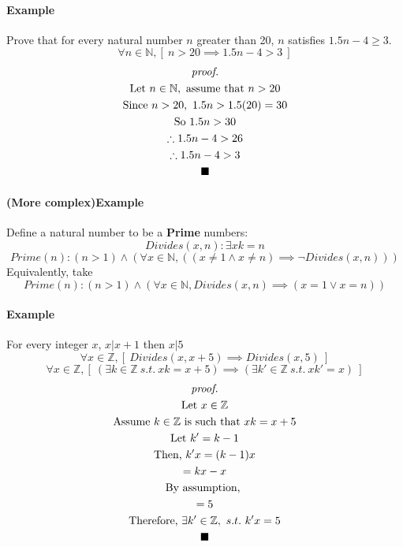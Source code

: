 \documentclass{article}
\begin{document}
	\paragraph{Example} Prove that for every natural number $n$ greater than 20, $n$ satisfies $1.5n-4\geq3$.
	\[
		\forall n \in \mathbb{N}, [\ n > 20 \implies 1.5n - 4 > 3\ ]
	\]
	\begin{multline*}
		\emph{proof.}\\
		\text{Let } n \in \mathbb{N}, \text{ assume that } n > 20 \\
		\text{Since } n > 20,\ 1.5n > 1.5(20) = 30 \\
		\text{So } 1.5 n > 30 \\
		\therefore 1.5n - 4 > 26 \\
		\therefore 1.5n - 4 > 3 \\
		\blacksquare
	\end{multline*}
	
	\paragraph{(More complex)Example} Define a natural number to be a \textbf{Prime} numbers:
	\[
		Divides(x,n): \exists x k = n
	\]
	\[
		Prime(n): (n > 1) \land (\forall x \in \mathbb{N}, ((x\neq1 \land x\neq n) \implies \neg Divides(x,n)))
	\]
	Equivalently, take 
	\[
		Prime(n): (n > 1) \land (\forall x \in \mathbb{N}, Divides(x,n) \implies (x = 1 \lor x = n))
	\]
	\paragraph{Example} For every integer $x$, $x \vert x + 1$ then $x \vert 5$
	\[
		\forall x \in \mathbb{Z}, [\ Divides(x, x+5) \implies Divides(x, 5)\ ]
	\]
	\[
		\forall x \in \mathbb{Z}, [\ (\exists k \in \mathbb{Z}\ s.t.\ xk = x + 5) \implies (\exists k' \in \mathbb{Z}\ s.t.\ xk' = x)\ ]
	\]
	\begin{multline*}
	\emph{proof.}\\
		\text{Let }x \in \mathbb{Z} \\
		\text{Assume } k \in \mathbb{Z} \text{ is such that } xk = x + 5 \\
		\text{Let } k' = k - 1 \\
		\text{Then, } k'x = (k - 1)x\\
		= kx - x \\
		\text{By assumption, } \\
		= 5 \\
		\text{Therefore, } \exists k' \in \mathbb{Z},\ s.t.\ k'x = 5 \\
		\blacksquare
	\end{multline*}
\end{document}
